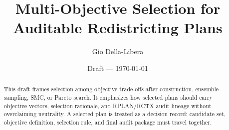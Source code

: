 \documentclass[12pt]{article}
\title{Multi-Objective Selection for Auditable Redistricting Plans}
\author{Gio Della-Libera}
\date{Draft --- \today}
\begin{document}
\maketitle

\begin{abstract}
This draft frames selection among objective trade-offs after construction,
ensemble sampling, SMC, or Pareto search. It emphasizes how selected plans
should carry objective vectors, selection rationale, and RPLAN/RCTX audit
lineage without overclaiming neutrality. A selected plan is treated as a
decision record: candidate set, objective definition, selection rule, and final
audit package must travel together.
\end{abstract}








\nocite{bisect-u14-plan}


\end{document}
